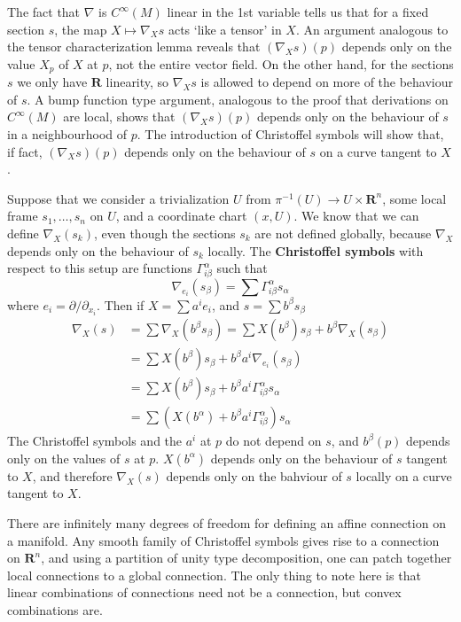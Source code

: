 The fact that $\nabla$ is $C^\infty(M)$ linear in the 1st variable tells us that for a fixed section $s$, the map $X \mapsto \nabla_X s$ acts `like a tensor' in $X$. An argument analogous to the tensor characterization lemma reveals that $(\nabla_X s)(p)$ depends only on the value $X_p$ of $X$ at $p$, not the entire vector field. On the other hand, for the sections $s$ we only have $\mathbf{R}$ linearity, so $\nabla_X s$ is allowed to depend on more of the behaviour of $s$. A bump function type argument, analogous to the proof that derivations on $C^\infty(M)$ are local, shows that $(\nabla_X s)(p)$ depends only on the behaviour of $s$ in a neighbourhood of $p$. The introduction of Christoffel symbols will show that, if fact, $(\nabla_X s)(p)$ depends only on the behaviour of $s$ on a curve tangent to $X$.

Suppose that we consider a trivialization $U$ from $\pi^{-1}(U) \to U \times \mathbf{R}^n$, some local frame $s_1, \dots, s_n$ on $U$, and a coordinate chart $(x,U)$. We know that we can define $\nabla_X(s_k)$, even though the sections $s_k$ are not defined globally, because $\nabla_X$ depends only on the behaviour of $s_k$ locally.  The {\bf Christoffel symbols} with respect to this setup are functions $\Gamma_{i \beta}^\alpha$ such that
%
\[ \nabla_{e_i}(s_\beta) = \sum \Gamma_{i \beta}^\alpha s_\alpha \]
%
where $e_i = \partial/\partial_{x_i}$. Then if $X = \sum a^i e_i$, and $s = \sum b^\beta s_\beta$
%
\begin{align*}
    \nabla_X(s) &= \sum \nabla_X(b^\beta s_\beta) = \sum X(b^\beta) s_\beta + b^\beta \nabla_X(s_\beta)\\
    &= \sum X(b^\beta) s_\beta + b^\beta a^i \nabla_{e_i}(s_\beta)\\
    &= \sum X(b^\beta) s_\beta + b^\beta a^i \Gamma_{i \beta}^\alpha s_\alpha\\
    &= \sum \left( X(b^\alpha) + b^\beta a^i \Gamma_{i \beta}^\alpha \right) s_\alpha
\end{align*}
%
The Christoffel symbols and the $a^i$ at $p$ do not depend on $s$, and $b^\beta(p)$ depends only on the values of $s$ at $p$. $X(b^\alpha)$ depends only on the behaviour of $s$ tangent to $X$, and therefore $\nabla_X(s)$ depends only on the bahviour of $s$ locally on a curve tangent to $X$.

There are infinitely many degrees of freedom for defining an affine connection on a manifold. Any smooth family of Christoffel symbols gives rise to a connection on $\mathbf{R}^n$, and using a partition of unity type decomposition, one can patch together local connections to a global connection. The only thing to note here is that linear combinations of connections need not be a connection, but convex combinations are.

